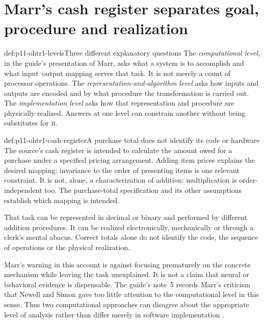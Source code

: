 \section{Marr's cash register separates goal, procedure and realization}
\label{sec:p11-ohtr1-marr}

\begin{hbdefinition}{def:p11-ohtr1-levels}{Three different explanatory questions}
The \emph{computational level}, in the guide's presentation of Marr, asks
what a system is to accomplish and what input--output mapping serves that
task. It is not merely a count of processor operations.
The \emph{representation-and-algorithm level} asks how inputs and outputs
are encoded and by what procedure the transformation is carried out.
The \emph{implementation level} asks how that representation and procedure
are physically realized. Answers at one level can constrain another without
being substitutes for it.
\end{hbdefinition}

\begin{hbexample}{def:p11-ohtr1-cash-register}{A purchase total does not identify its code or hardware}
The source's cash register is intended to calculate the amount owed for a
purchase under a specified pricing arrangement. Adding item prices explains
the desired mapping; invariance to the order of presenting items is one
relevant constraint. It is not, alone, a characterization of addition:
multiplication is order-independent too. The purchase-total specification
and its other assumptions establish which mapping is intended.

That task can be represented in decimal or binary and performed by different
addition procedures. It can be realized electronically, mechanically or
through a clerk's mental abacus. Correct totals alone do not identify the
code, the sequence of operations or the physical realization.
\end{hbexample}

Marr's warning in this account is against focusing prematurely on the concrete
mechanism while leaving the task unexplained. It is not a claim that neural
or behavioral evidence is dispensable. The guide's note~5 records Marr's
criticism that Newell and Simon gave too little attention to the computational
level in this sense. Thus two computational approaches can disagree about
the appropriate level of analysis rather than differ merely in software
implementation \parencite[p.~4, note~5 on p.~7]{HolyoakMorrison2012ReadersGuide}.

